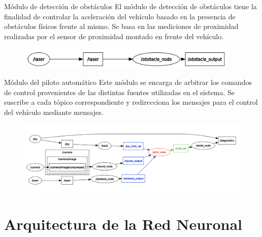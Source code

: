 \documentclass[10pt]{beamer}
\begin{document}
\begin{frame}{Módulo de detección de obstáculos}
    El módulo de detección de obstáculos tiene la finalidad de controlar la aceleración del vehículo basado en la 
    presencia de obstáculos físicos frente al mismo. Se basa en las mediciones de proximidad realizadas por el 
    sensor de proximidad montado en frente del vehículo. 

    \begin{figure}[!h] 
        \centering
        \includegraphics[width=0.95\textwidth]{../img/nodosobs}
        \end{figure}
\end{frame}


\begin{frame}{Módulo del piloto automático}
    Este módulo se encarga de arbitrar los comandos de control provenientes de las distintas fuentes utilizadas en el sistema. Se 
    suscribe a cada tópico correspondiente y redirecciona los mensajes para el control del vehículo mediante mensajes.

    \begin{figure}[!ht] 
        \centering
        \includegraphics[width=\textwidth]{../img/nodesauto}
        \end{figure}

\end{frame}

\section*{Arquitectura de la Red Neuronal}

\end{document}
